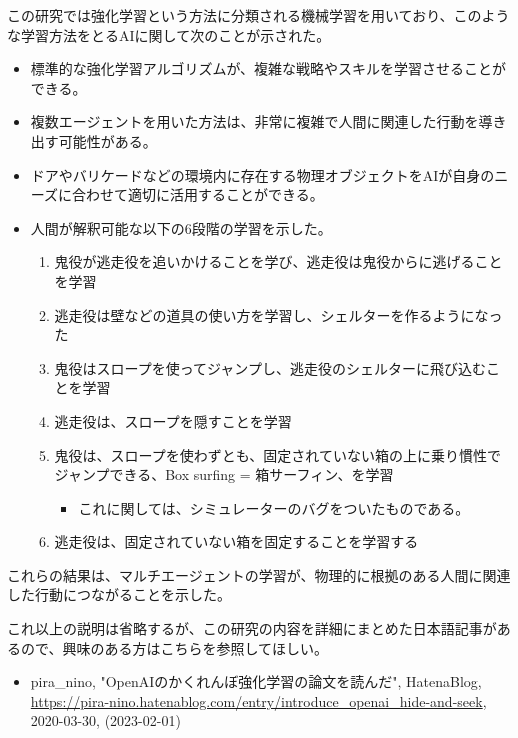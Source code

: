 \documentclass[dvipdfmx]{jsarticle}
\begin{document}
        この研究では強化学習という方法に分類される機械学習を用いており、このような学習方法をとるAIに関して次のことが示された。
        \begin{itemize}
            \item 標準的な強化学習アルゴリズムが、複雑な戦略やスキルを学習させることができる。
            \item 複数エージェントを用いた方法は、非常に複雑で人間に関連した行動を導き出す可能性がある。
            \item ドアやバリケードなどの環境内に存在する物理オブジェクトをAIが自身のニーズに合わせて適切に活用することができる。
            \item 人間が解釈可能な以下の6段階の学習を示した。
            \begin{enumerate}
                \item 鬼役が逃走役を追いかけることを学び、逃走役は鬼役からに逃げることを学習
                \item 逃走役は壁などの道具の使い方を学習し、シェルターを作るようになった
                \item 鬼役はスロープを使ってジャンプし、逃走役のシェルターに飛び込むことを学習
                \item 逃走役は、スロープを隠すことを学習
                \item 鬼役は、スロープを使わずとも、固定されていない箱の上に乗り慣性でジャンプできる、Box surfing = 箱サーフィン、を学習
                \begin{itemize}
                    \item これに関しては、シミュレーターのバグをついたものである。
                \end{itemize}
                \item 逃走役は、固定されていない箱を固定することを学習する
            \end{enumerate}
        \end{itemize}
        これらの結果は、マルチエージェントの学習が、物理的に根拠のある人間に関連した行動につながることを示した。\par 
        これ以上の説明は省略するが、この研究の内容を詳細にまとめた日本語記事があるので、興味のある方はこちらを参照してほしい。
        \begin{itemize}
            \item pira\_nino, "OpenAIのかくれんぼ強化学習の論文を読んだ", HatenaBlog, \url{https://pira-nino.hatenablog.com/entry/introduce_openai_hide-and-seek}, 2020-03-30, (2023-02-01)
        \end{itemize}
\end{document}
